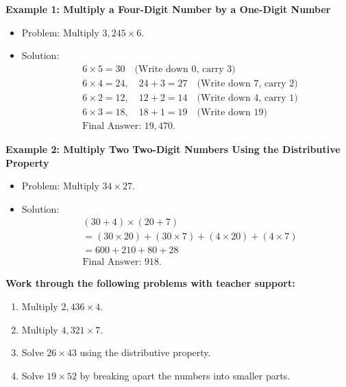 \documentclass[12pt]{article}
\begin{document}
\begin{tcolorbox}[colframe=black!60, colback=white, 
coltitle=black, colbacktitle=black!15, fonttitle=\bfseries\Large, 
title=Examples, halign title=center, left=10pt, right=10pt, top=10pt, bottom=15pt]
\textbf{Example 1: Multiply a Four-Digit Number by a One-Digit Number}
\begin{itemize}
    \item Problem: Multiply \( 3,245 \times 6 \).
    \item Solution:
    \[
    \begin{aligned}
    &6 \times 5 = 30 \quad \text{(Write down 0, carry 3)} \\
    &6 \times 4 = 24, \quad 24 + 3 = 27 \quad \text{(Write down 7, carry 2)} \\
    &6 \times 2 = 12, \quad 12 + 2 = 14 \quad \text{(Write down 4, carry 1)} \\
    &6 \times 3 = 18, \quad 18 + 1 = 19 \quad \text{(Write down 19)} \\
    &\text{Final Answer: } 19,470.
    \end{aligned}
    \]
\end{itemize}

\textbf{Example 2: Multiply Two Two-Digit Numbers Using the Distributive Property}
\begin{itemize}
    \item Problem: Multiply \( 34 \times 27 \).
    \item Solution:
    \[
    \begin{aligned}
    &(30 + 4) \times (20 + 7) \\
    &= (30 \times 20) + (30 \times 7) + (4 \times 20) + (4 \times 7) \\
    &= 600 + 210 + 80 + 28 \\
    &\text{Final Answer: } 918.
    \end{aligned}
    \]
\end{itemize}
\end{tcolorbox}


\begin{tcolorbox}[colframe=black!60, colback=white, 
coltitle=black, colbacktitle=black!15, fonttitle=\bfseries\Large, 
title=Guided Practice, halign title=center, left=10pt, right=10pt, top=10pt, bottom=45pt]
\textbf{Work through the following problems with teacher support:}
\begin{enumerate}[itemsep=3em]
    \item Multiply \( 2,436 \times 4 \). \vspace{1cm}
    \item Multiply \( 4,321 \times 7 \). \vspace{1cm}
    \item Solve \( 26 \times 43 \) using the distributive property. \vspace{1cm}
    \item Solve \( 19 \times 52 \) by breaking apart the numbers into smaller parts. \vspace{2cm}
\end{enumerate}
\end{tcolorbox}
\end{document}
